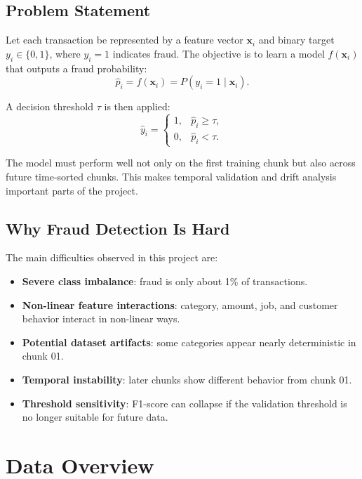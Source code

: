 \documentclass[12pt,a4paper,twoside]{article}
\begin{document}
\subsection{Problem Statement}

Let each transaction be represented by a feature vector $\mathbf{x}_i$ and binary target $y_i \in \{0,1\}$, where $y_i=1$ indicates fraud. The objective is to learn a model $f(\mathbf{x}_i)$ that outputs a fraud probability:
\begin{equation}
    \hat{p}_i = f(\mathbf{x}_i) = P(y_i = 1 \mid \mathbf{x}_i).
\end{equation}

A decision threshold $\tau$ is then applied:
\begin{equation}
    \hat{y}_i =
    \begin{cases}
        1, & \hat{p}_i \ge \tau,\\
        0, & \hat{p}_i < \tau.
    \end{cases}
\end{equation}

The model must perform well not only on the first training chunk but also across future time-sorted chunks. This makes temporal validation and drift analysis important parts of the project.

\subsection{Why Fraud Detection Is Hard}

The main difficulties observed in this project are:
\begin{itemize}
    \item \textbf{Severe class imbalance}: fraud is only about 1\% of transactions.
    \item \textbf{Non-linear feature interactions}: category, amount, job, and customer behavior interact in non-linear ways.
    \item \textbf{Potential dataset artifacts}: some categories appear nearly deterministic in chunk 01.
    \item \textbf{Temporal instability}: later chunks show different behavior from chunk 01.
    \item \textbf{Threshold sensitivity}: F1-score can collapse if the validation threshold is no longer suitable for future data.
\end{itemize}

\clearpage
\section{Data Overview}
\end{document}
